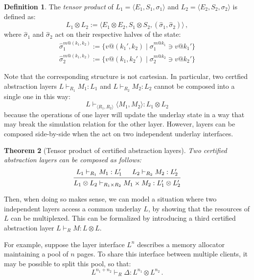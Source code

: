 \documentclass[draft,11pt]{report}
\newtheorem{theorem}{Theorem}[chapter]
\theoremstyle{definition}
\newtheorem{definition}[theorem]{Definition}
\begin{document}
\begin{definition}
The \emph{tensor product} of
$L_1 = \langle E_1, S_1, \sigma_1 \rangle$ and
$L_2 = \langle E_2, S_2, \sigma_2 \rangle$
is defined as:
\[
  L_1 \otimes L_2 := \langle
    E_1 \otimes E_2,
    S_1 \otimes S_2,
    (\hat{\sigma}_1, \hat{\sigma}_2)
  \rangle \,,
\]
where $\hat{\sigma}_1$ and $\hat{\sigma}_2$
act on their respective halves of the state:
\begin{gather*}
  \hat{\sigma}_1^{m@(k_1, k_2)} :=
    \{ v@(k_1', k_2) \mid \sigma_1^{m@k_1} \ni v@k_1' \} \\
  \hat{\sigma}_2^{m@(k_1, k_2)} :=
    \{ v@(k_1, k_2') \mid \sigma_2^{m@k_2} \ni v@k_2' \}
\end{gather*}
\end{definition}

Note that the corresponding structure is not cartesian.
In particular, two certfied abstraction layers
$L \vdash_{R_1} M_1 : L_1$ and
$L \vdash_{R_2} M_2 : L_2$
cannot be composed into a single one in this way:
\[
  L \vdash_{\langle R_1, R_2 \rangle} \langle M_1, M_2 \rangle : L_1
\otimes L_2
\]
because the operations of one layer will update the underlay state
in a way that may break the simulation relation for the other layer.
However, layers can be composed side-by-side
when the act on two independent underlay interfaces.

\begin{theorem}[Tensor product of certified abstraction layers]
Two certified abstraction layers can be composed as follows:
\[
  \begin{prooftree}
    \hypo{L_1 \vdash_{R_1} M_1 : L_1'}
    \hypo{L_2 \vdash_{R_2} M_2 : L_2'}
    \infer2{L_1 \otimes L_2 \vdash_{R_1 \times R_2}
      M_1 \times M_2 : L_1' \otimes L_2'}
  \end{prooftree}
\]
\end{theorem}

Then,
when doing so makes sense,
we can model a situation where
two independent layers access a common underlay $L$,
by showing that the resources of $L$
can be multiplexed.
This can be formalized
by introducing a third certified abstraction layer
$L \vdash_R M : L \otimes L$.

For example,
suppose the layer interface $L^n$
describes a memory allocator maintaining a pool of $n$ pages.
To share this interface between multiple clients,
it may be possible to split this pool,
so that:
\[
  L^{n_1 + n_2} \vdash_R \Delta : L^{n_1} \otimes L^{n_2}
  \,.
\]
\end{document}
